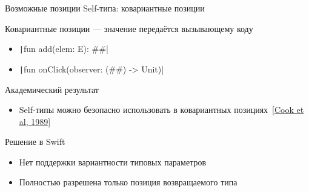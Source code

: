 \documentclass[usenames, dvipsnames]{beamer}
\begin{document}
    \begin{frame}[fragile]{Возможные позиции Self-типа: ковариантные позиции}

        \begin{block}{Ковариантные позиции --- значение передаётся вызывающему коду}
            \begin{itemize}
                \item \texttt|fun add(elem: E): ##| %
                \item \texttt|fun onClick(observer: (##) -> Unit)| %
            \end{itemize}
        \end{block}

        \begin{block}{Академический результат}
            \begin{itemize}
                \item Self-типы можно безопасно использовать в ковариантных позициях~[\href{https://dl.acm.org/doi/pdf/10.1145/96709.96721}{Cook et al, 1989}]
            \end{itemize}
        \end{block}

        \begin{block}{Решение в Swift}
            \begin{itemize}
                \item Нет поддержки вариантности типовых параметров
                \item Полностью разрешена только позиция возвращаемого типа
            \end{itemize}
        \end{block}


\end{frame}
\end{document}

